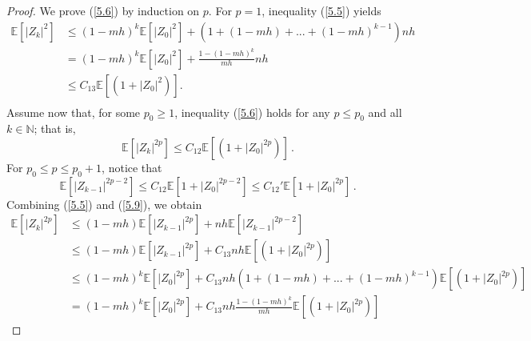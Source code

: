 \documentclass[12pt]{article}
\numberwithin{equation}{section}
\begin{document}
\begin{proof} We prove (\ref{5.6}) by induction on $p$.  For $p = 1$, inequality (\ref{5.5}) yields 
\begin{equation}\tag{5.55}\label{5.7}
\begin{aligned}
\mathbb{E} \left[ \left| Z_k \right|^2 \right] &\le \left(1-mh\right)^k\mathbb{E} \left[ \left| Z_0 \right|^2 \right] +\left( 1+\left(1-mh\right)+...+\left(1-mh\right)^{k-1} \right) nh
\\
&=\left(1-mh\right)^k\mathbb{E} \left[ \left| Z_0 \right|^2 \right] +\tfrac{1-\left(1-mh\right)^k}{mh}nh
\\
&\leq C_{13}\mathbb{E} \left[ \left( 1+\left| Z_0 \right|^2 \right) \right]. \\
\end{aligned}
\end{equation}
Assume now that, for some $p_0 \geq 1$, inequality (\ref{5.6}) holds for any $p \leq p_0$ and all $k \in \mathbb{N}$; that is,
\begin{equation}\tag{5.56}\label{5.8}
\mathbb{E}\left[\left|Z_k\right|^{2 p}\right] \leq C_{12}\mathbb{E}\left[\left(1+\left|Z_0\right|^{2 p}\right)\right]\,. 
\end{equation}
For $p_0\le p\le p_0+1$, notice that
\begin{equation}\tag{5.57}\label{5.9}
\mathbb{E} \left[ \left|Z_{k-1}\right|^{2p-2} \right]\le 
C_{12} \mathbb{E} \left [ 1+\left|Z_0\right|^{2p-2}\right]\le
C_{12}' \mathbb{E} \left [ 1+\left|Z_0\right|^{2p}\right]\,. 
\end{equation}
Combining (\ref{5.5}) and (\ref{5.9}), we obtain
\begin{equation}\tag{5.58}\label{5.10}
\begin{aligned}
 \mathbb{E} \left[ \left| Z_k \right|^{2p} \right]& \le \left(1-mh\right)\mathbb{E} \left[ \left| Z_{k-1} \right|^{2p} \right] +nh\mathbb{E} \left[ \left| Z_{k-1} \right|^{2p-2} \right] 
\\
&\le \left(1-mh\right)\mathbb{E} \left[ \left| Z_{k-1} \right|^{2p} \right] +C_{13}nh\mathbb{E} \left[ \left( 1+\left| Z_0 \right|^{2p} \right) \right] 
\\
&\le \left(1-mh\right)^k\mathbb{E} \left[ \left| Z_0 \right|^{2p} \right] +C_{13}nh\left( 1+\left(1-mh\right)+...+\left(1-mh\right)^{k-1} \right) \mathbb{E} \left[ \left( 1+\left| Z_0 \right|^{2p} \right) \right] 
\\
&=\left(1-mh\right)^k\mathbb{E} \left[ \left| Z_0 \right|^{2p}\right] +C_{13}nh\tfrac{1-\left(1-mh\right)^k}{mh}\mathbb{E} \left[ \left( 1+\left| Z_0 \right|^{2p} \right) \right] 

\end{aligned}
\end{equation}
\end{proof}
\end{document}
